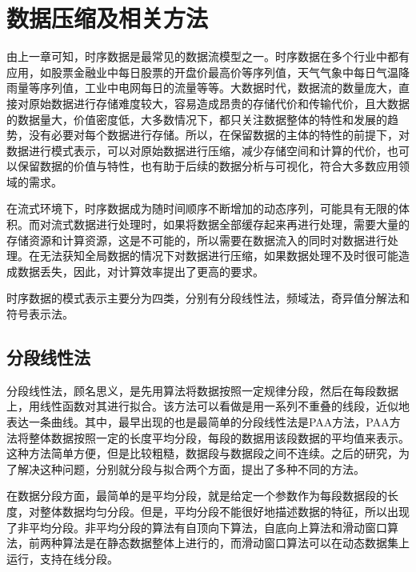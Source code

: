 \section{数据压缩及相关方法}
由上一章可知，时序数据是最常见的数据流模型之一。时序数据在多个行业中都有应用，如股票金融业中每日股票的开盘价最高价等序列值，天气气象中每日气温降雨量等序列值，工业中电网每日的流量等等。大数据时代，数据流的数量庞大，直接对原始数据进行存储难度较大，容易造成昂贵的存储代价和传输代价，且大数据的数据量大，价值密度低，大多数情况下，都只关注数据整体的特性和发展的趋势，没有必要对每个数据进行存储。所以，在保留数据的主体的特性的前提下，对数据进行模式表示，可以对原始数据进行压缩，减少存储空间和计算的代价，也可以保留数据的价值与特性，也有助于后续的数据分析与可视化，符合大多数应用领域的需求。

在流式环境下，时序数据成为随时间顺序不断增加的动态序列，可能具有无限的体积。而对流式数据进行处理时，如果将数据全部缓存起来再进行处理，需要大量的存储资源和计算资源，这是不可能的，所以需要在数据流入的同时对数据进行处理。在无法获知全局数据的情况下对数据进行压缩，如果数据处理不及时很可能造成数据丢失，因此，对计算效率提出了更高的要求。

时序数据的模式表示主要分为四类，分别有分段线性法，频域法，奇异值分解法和符号表示法。

\subsection{分段线性法}
分段线性法，顾名思义，是先用算法将数据按照一定规律分段，然后在每段数据上，用线性函数对其进行拟合。该方法可以看做是用一系列不重叠的线段，近似地表达一条曲线。其中，最早出现的也是最简单的分段线性法是PAA方法，PAA方法将整体数据按照一定的长度平均分段，每段的数据用该段数据的平均值来表示。这种方法简单方便，但是比较粗糙，数据段与数据段之间不连续。之后的研究，为了解决这种问题，分别就分段与拟合两个方面，提出了多种不同的方法。

在数据分段方面，最简单的是平均分段，就是给定一个参数作为每段数据段的长度，对整体数据均匀分段。但是，平均分段不能很好地描述数据的特征，所以出现了非平均分段。非平均分段的算法有自顶向下算法，自底向上算法和滑动窗口算法，前两种算法是在静态数据整体上进行的，而滑动窗口算法可以在动态数据集上运行，支持在线分段。

